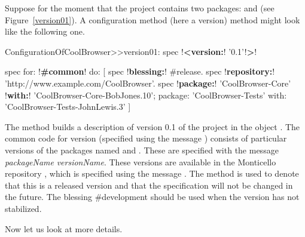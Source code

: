 \documentclass[a4paper,10pt,twoside]{book}
\begin{document}
Suppose for the moment that the project  contains two packages:  and  (see Figure~\ref{version01}). A configuration method (here a version) method might look like the following one.

\begin{code}{}
ConfigurationOfCoolBrowser>>version01: spec
	!\textbf{<version:}! '0.1'!\textbf{>}!

	spec for: !\textbf{\#common}! do: [
    spec !\textbf{blessing:}! #release.
		spec !\textbf{repository:}! 'http://www.example.com/CoolBrowser'.
		spec
		    !\textbf{package:}! 'CoolBrowser-Core'  !\textbf{with:}! 'CoolBrowser-Core-BobJones.10';
			package: 'CoolBrowser-Tests' with: 'CoolBrowser-Tests-JohnLewis.3' ]
\end{code}

\noindent
The  method  builds a description of version 0.1 of the project in the object .
The common code for version  (specified using the message ) consists of particular versions of the packages named  and .
These are specified with the message  \emph{packageName}  \emph{versionName}.
These versions are available in the Monticello repository , which is specified using the message . The   method is used to denote that this is a released version and that the specification will not be changed in the future. The blessing \#development should be used when the version has not stabilized.

Now let us look at more details.
\end{document}
